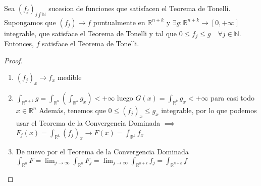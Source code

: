 \begin{lema}
    Sea $(f_j)_{j\int\mathbb{N}}$ sucesion de funciones que satisfacen el Teorema de Tonelli. Supongamos que $(f_j)\to f$ puntualmente en $\mathbb{R}^{n+k}$ y $\exists g: \mathbb{R}^{n+k} \to [0, +\infty]$ integrable, que satisface el Teorema de Tonelli y tal que $ 0 \leq f_j \leq g \quad \forall j \in \mathbb{N}$. Entonces, $f$ satisface el Teorema de Tonelli.\label{lema3Tonelli}
\end{lema}
\begin{proof}
    \leavevmode
    \begin{enumerate}
        \item $(f_j)_x \to f_x$ medible
        \item $\int_{\mathbb{R}^{n+k}}g = \int_{\mathbb{R}^n}(\int_{\mathbb{R}^k}g_x) < +\infty$ luego $G(x) = \int_{\mathbb{R}^k}g_x < +\infty$ para casi todo $x \in \mathbb{R}^n$
              Además, tenemos que $0 \leq (f_j)_x \leq g_x$ integrable, por lo que podemos usar el Teorema de la Convergencia Dominada $\implies$
              $F_j(x) = \int_{\mathbb{R}^k}(f_j)_x \to F(x) = \int_{\mathbb{R}^k}f_x$
        \item De nuevo por el Teorema de la Convergencia Dominada $\int_{\mathbb{R}^n}F =
                  \lim_{j \to \infty}\int_{\mathbb{R}^n}F_j = \lim_{j \to
                      \infty}\int_{\mathbb{R}^{n+k}}f_j = \int_{\mathbb{R}^{n+k}}f$
    \end{enumerate}
\end{proof}

